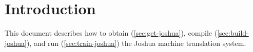 \chapter{Introduction}

This document describes how to obtain (\cref{sec:get-joshua}), compile (\cref{sec:build-joshua}), and run (\cref{sec:train-joshua}) the Joshua machine translation system.

 